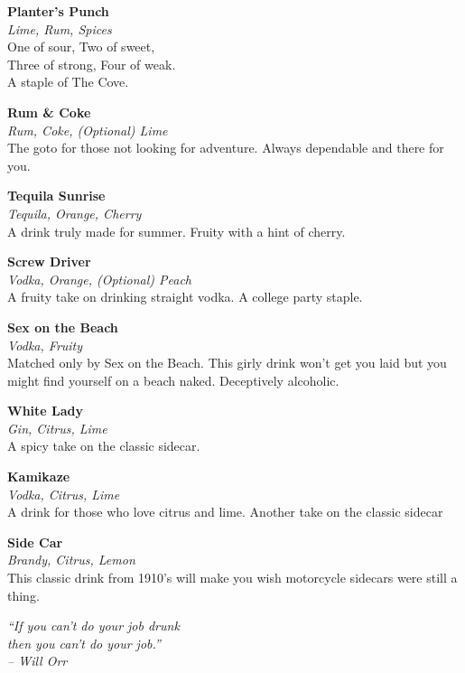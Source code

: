 \documentclass[12pt]{article}
\newcommand{\drink}[3]{
    \begin{center}
        \noindent\large \textbf{#1}
        \\\small \textit{#2}\\
        \normalsize #3 \\
        \vspace{8 mm}
    \end{center}
}
\begin{document}
\begin{multicols}{2}
    \drink{Planter's Punch}{Lime, Rum, Spices}{
        One of sour, Two of sweet, \\
        Three of strong, Four of weak.\\
        A staple of The Cove.
    }

    \drink{Rum \& Coke}{Rum, Coke, (Optional) Lime}{
        The goto for those not looking for adventure.
        Always dependable and there for you.
    }

    \drink{Tequila Sunrise}{Tequila, Orange, Cherry}{
        A drink truly made for summer. Fruity with a hint of cherry.
    }

    \drink{Screw Driver}{Vodka, Orange, (Optional) Peach}{
        A fruity take on drinking straight vodka. A college party staple.
    }

    \columnbreak

    \drink{Sex on the Beach}{Vodka, Fruity}{
        Matched only by Sex on the Beach. This girly drink won't get you laid
        but you might find yourself on a beach naked. Deceptively alcoholic.
    }

   \drink{White Lady}{Gin, Citrus, Lime}{
      A spicy take on the classic sidecar.
   }

   \drink{Kamikaze}{Vodka, Citrus, Lime}{
      A drink for those who love citrus and lime. Another take on the classic
      sidecar
   }

   \drink{Side Car}{Brandy, Citrus, Lemon}{
      This classic drink from 1910's will make you wish motorcycle sidecars
      were still a thing.
   }

\end{multicols}

\vfill
\begin{center}
    \noindent\textit{
       ``If you can't do your job drunk \\
       then you can't do your job.'' \\
       -- Will Orr
    }
\end{center}
\end{document}
